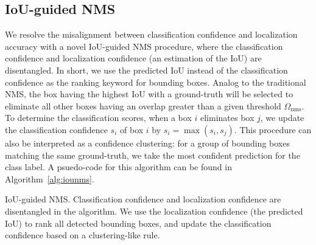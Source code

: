 \documentclass[runningheads]{llncs}
\begin{document}
\subsection{IoU-guided NMS}
\label{sec:iouguided NMS}
We resolve the misalignment between classification confidence and localization accuracy with a novel IoU-guided NMS procedure, where the classification confidence and localization confidence (an estimation of the IoU) are  disentangled.
In short, we use the predicted IoU instead of the classification confidence as the ranking keyword for bounding boxes. Analog to the traditional NMS, the box having the highest IoU with a ground-truth will be selected to eliminate all other boxes having an overlap greater than a given threshold $\Omega_{\text{nms}}$. To determine the classification scores, when a box $i$ eliminates box $j$, we update the classification confidence $s_i$ of box $i$ by $s_i = \max(s_i, s_j)$. This procedure can also be interpreted as a confidence clustering: for a group of bounding boxes matching the same ground-truth, we take the most confident prediction for the class label. A psuedo-code for this algorithm can be found in Algorithm~\ref{alg:iounms}.

\begin{algorithm}[!t]
\caption{IoU-guided NMS. Classification confidence and localization confidence are disentangled in the algorithm. We use the localization confidence (the predicted IoU) to rank all detected bounding boxes, and update the classification confidence based on a clustering-like rule.}
\label{alg:iounms}
\begin{algorithmic}[1]
        \EndIf
    \EndFor
\EndWhile
{}
\end{algorithmic}
\end{algorithm}
\end{document}
